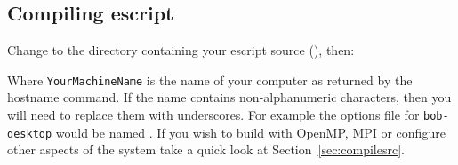 % 
% 
% 
% 
% 
% 
% 

\subsection{Compiling escript}\label{sec:compileescriptlinux}

Change to the directory containing your escript source (), then:

Where \texttt{YourMachineName} is the name of your computer as returned by the hostname command.
If the name contains non-alphanumeric characters, then you will need to replace them with underscores.
For example the options file for \texttt{bob-desktop} would be named .
If you wish to build with OpenMP, MPI or configure other aspects of the system take a quick look at Section~\ref{sec:compilesrc}.


